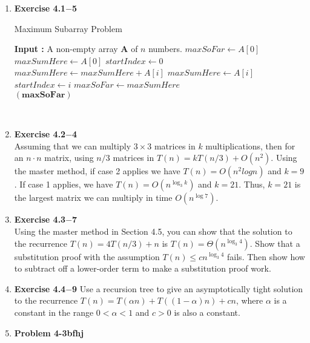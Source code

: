 \documentclass[a4paper,11pt,oneside]{book}
\begin{document}
\begin{enumerate}
  \item {\textbf{Exercise 4.1$-$5}}
  \\
  \begin{algorithm}
    \caption{Maximum Subarray Problem}
    \begin{algorithmic}[1]
        \Statex \textbf{Input :} A non-empty array $\mathbf{A}$ of $n$ numbers.
        \State $maxSoFar \gets A[0]$
        \State $maxSumHere \gets A[0]$
        \State $startIndex \gets 0$
          \State $maxSumHere \gets maxSumHere + A[i]$
        \Else
          \State $maxSumHere \gets A[i]$
          \State $startIndex \gets i$
        \EndIf
          \State $maxSoFar \gets maxSumHere$
        \EndIf
        \EndFor
        \\
        \Return $\mathbf{(maxSoFar)}$
        \EndFunction
    \end{algorithmic}
\end{algorithm}
\\


  \item {\textbf{Exercise 4.2$-$4}}
  \\ Assuming that we can multiply $3 \times 3$ matrices in $k$ multiplications, then for an $n \cdot n$ matrix, using $n/3$ matrices in 
  $T(n) =  kT(n/3) + O(n^2)$. Using the master method, if case 2 applies we have $T(n) = O(n^2logn)$ and $k = 9$.
  If case 1 applies, we have $T(n) = O(n^{\log_3 k})$ and $k = 21$. Thus, $k = 21$ is the largest matrix we can multiply in
  time $O\left(n^{\log 7}\right)$.

  \item {\textbf{Exercise 4.3$-$7}}
  \\ Using the master method in Section 4.5, you can show that the solution to the recurrence $T(n)=4 T(n / 3)+n$ is $T(n)=\Theta\left(n^{\log _3 4}\right)$. Show that a substitution proof with the assumption $T(n) \leq c n^{\log _3 4}$ fails. Then show how to subtract off a lower-order term to make a substitution proof work.

  
  \item {\textbf{Exercise 4.4$-$9}}
   Use a recursion tree to give an asymptotically tight solution to the recurrence $T(n)=T(\alpha n)+T((1-\alpha) n)+c n$, where $\alpha$ is a constant in the range $0<\alpha<1$ and $c>0$ is also a constant.

  \item {\textbf{Problem 4-3bfhj}} 
    
\end{enumerate}
\end{document}
